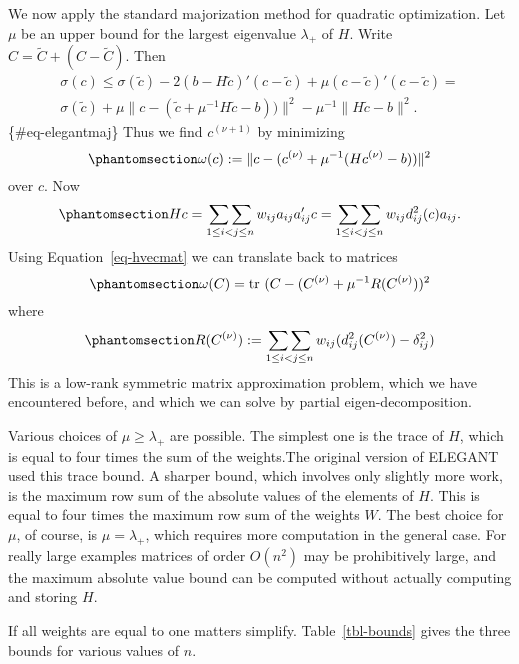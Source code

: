 \documentclass[
  12pt,
  letterpaper,
  DIV=11,
  numbers=noendperiod]{scrartcl}
\begin{document}
We now apply the standard majorization method for quadratic
optimization. Let \(\mu\) be an upper bound for the largest eigenvalue
\(\lambda_+\) of \(H\). Write \(C=\tilde C+(C-\tilde C)\). Then
\begin{multline}
\sigma(c)\leq\sigma(\tilde c)-2 (b-H\tilde c)'(c-\tilde c)+\mu(c-\tilde c)'(c-\tilde c)=\\\sigma(\tilde c)+\mu\|c-(\tilde c+\mu^{-1}H\tilde c-b))\|^2-\mu^{-1}\|H\tilde c-b\|^2.
\end{multline}\{\#eq-elegantmaj\} Thus we find \(c^{(\nu+1)}\) by
minimizing \begin{equation}\phantomsection\label{eq-elegantstep}{
\omega(c):=\|c-(c^{(\nu)}+\mu^{-1}(Hc^{(\nu)}-b))\|^2
}\end{equation} over \(c\). Now
\begin{equation}\phantomsection\label{eq-hvecmat}{
Hc=\mathop{\sum\sum}_{1\leq i<j\leq n}w_{ij}a_{ij}a_{ij}' c=\mathop{\sum\sum}_{1\leq i<j\leq n}w_{ij}d_{ij}^2(c)a_{ij}.
}\end{equation} Using Equation~\ref{eq-hvecmat} we can translate back to
matrices \begin{equation}\phantomsection\label{eq-omegamat}{
\omega(C)=\text{tr}\ (C-(C^{(\nu)}+\mu^{-1}R(C^{(\nu)}))^2
}\end{equation} where
\begin{equation}\phantomsection\label{eq-relegant}{
R(C^{(\nu)}):=\mathop{\sum\sum}_{1\leq i<j\leq n}w_{ij}(d_{ij}^2(C^{(\nu)})-\delta_{ij}^2)
}\end{equation} This is a low-rank symmetric matrix approximation
problem, which we have encountered before, and which we can solve by
partial eigen-decomposition.

Various choices of \(\mu\geq\lambda_+\) are possible. The simplest one
is the trace of \(H\), which is equal to four times the sum of the
weights.The original version of ELEGANT used this trace bound. A sharper
bound, which involves only slightly more work, is the maximum row sum of
the absolute values of the elements of \(H\). This is equal to four
times the maximum row sum of the weights \(W\). The best choice for
\(\mu\), of course, is \(\mu=\lambda_+\), which requires more
computation in the general case. For really large examples matrices of
order \(O(n^2)\) may be prohibitively large, and the maximum absolute
value bound can be computed without actually computing and storing
\(H\).

If all weights are equal to one matters simplify. Table~\ref{tbl-bounds}
gives the three bounds for various values of \(n\).
\end{document}
